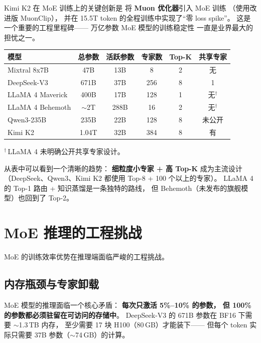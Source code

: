 Kimi K2 在 MoE 训练上的关键创新是
将 \textbf{Muon 优化器}引入 MoE 训练
（使用改进版 MuonClip），
并在 15.5T token 的全程训练中实现了``零 loss spike''。
这是一个重要的工程里程碑——
万亿参数 MoE 模型的训练稳定性
一直是业界最大的担忧之一。

\begin{keybox}
\begin{center}
\begin{tabular}{lccccc}
  \hline
  \textbf{模型} & \textbf{总参数} & \textbf{活跃参数}
  & \textbf{专家数} & \textbf{Top-K} & \textbf{共享专家} \\
  \hline
  Mixtral 8x7B & 47B & 13B & 8 & 2 & 无 \\
  DeepSeek-V3 & 671B & 37B & 256 & 8 & 1 \\
  LLaMA 4 Maverick & 400B & 17B & 128 & 1 & 无$^\dagger$ \\
  LLaMA 4 Behemoth & $\sim$2T & 288B & 16 & 2 & 无$^\dagger$ \\
  Qwen3-235B & 235B & 22B & 128 & 8 & 未公开 \\
  Kimi K2 & 1.04T & 32B & 384 & 8 & 有 \\
  \hline
\end{tabular}
\end{center}

\small $^\dagger$\,LLaMA 4 未明确公开共享专家设计。
\end{keybox}

从表中可以看到一个清晰的趋势：
\textbf{细粒度小专家 + 高 Top-K} 成为主流设计
（DeepSeek、Qwen3、Kimi K2 都使用 Top-8 + 100 个以上的专家）。
LLaMA 4 的 Top-1 路由 + 知识蒸馏是一条独特的路线，
但 Behemoth（未发布的旗舰模型）也回到了 Top-2。

\section{MoE 推理的工程挑战}
\label{sec:moe-inference}

MoE 的训练效率优势在推理端面临严峻的工程挑战。

\subsection{内存瓶颈与专家卸载}

MoE 模型的推理面临一个核心矛盾：
\textbf{每次只激活 5\%--10\% 的参数，
但 100\% 的参数都必须驻留在可访问的存储中}。
DeepSeek-V3 的 671B 参数在 BF16 下需要 $\sim$1.3\,TB 内存，
至少需要 17 块 H100（80\,GB）才能装下——
但每个 token 实际只需要 37B 参数（$\sim$74\,GB）的计算。

